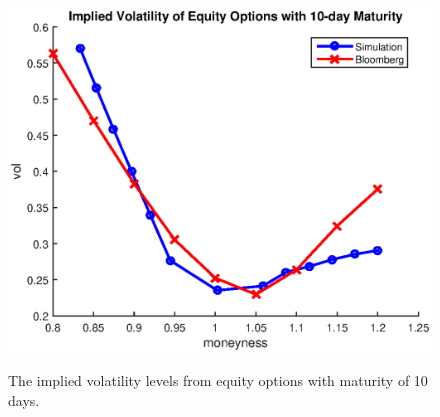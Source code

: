 \documentclass{article}
\begin{document}
\begin{center}
\begin{figure}
  \centering
  \includegraphics[scale = 0.5]{implied_vol.eps}\\
  \caption{The implied volatility levels from equity options with maturity of 10 days.}\label{fig::Put_Option_Vols}
\end{figure}
\end{center}
\end{document}
